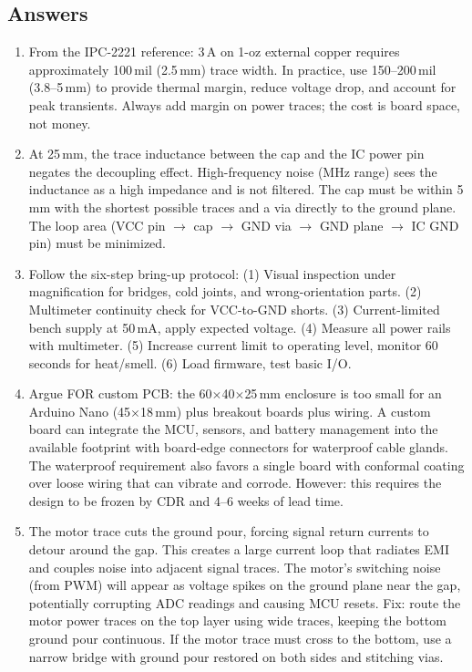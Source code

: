 \documentclass[11pt,letterpaper,twoside,openany]{book}
\begin{document}
\subsection{Answers}
\begin{enumerate}[leftmargin=1.5em]
\item From the IPC-2221 reference: 3\,A on 1-oz external copper requires approximately 100\,mil (2.5\,mm) trace width. In practice, use 150--200\,mil (3.8--5\,mm) to provide thermal margin, reduce voltage drop, and account for peak transients. Always add margin on power traces; the cost is board space, not money.
\item At 25\,mm, the trace inductance between the cap and the IC power pin negates the decoupling effect. High-frequency noise (MHz range) sees the inductance as a high impedance and is not filtered. The cap must be within 5\,mm with the shortest possible traces and a via directly to the ground plane. The loop area (VCC pin $\to$ cap $\to$ GND via $\to$ GND plane $\to$ IC GND pin) must be minimized.
\item Follow the six-step bring-up protocol: (1) Visual inspection under magnification for bridges, cold joints, and wrong-orientation parts. (2) Multimeter continuity check for VCC-to-GND shorts. (3) Current-limited bench supply at 50\,mA, apply expected voltage. (4) Measure all power rails with multimeter. (5) Increase current limit to operating level, monitor 60 seconds for heat/smell. (6) Load firmware, test basic I/O.
\item Argue FOR custom PCB: the 60$\times$40$\times$25\,mm enclosure is too small for an Arduino Nano (45$\times$18\,mm) plus breakout boards plus wiring. A custom board can integrate the MCU, sensors, and battery management into the available footprint with board-edge connectors for waterproof cable glands. The waterproof requirement also favors a single board with conformal coating over loose wiring that can vibrate and corrode. However: this requires the design to be frozen by CDR and 4--6 weeks of lead time.
\item The motor trace cuts the ground pour, forcing signal return currents to detour around the gap. This creates a large current loop that radiates EMI and couples noise into adjacent signal traces. The motor's switching noise (from PWM) will appear as voltage spikes on the ground plane near the gap, potentially corrupting ADC readings and causing MCU resets. Fix: route the motor power traces on the top layer using wide traces, keeping the bottom ground pour continuous. If the motor trace must cross to the bottom, use a narrow bridge with ground pour restored on both sides and stitching vias.

\end{enumerate}
\end{document}
